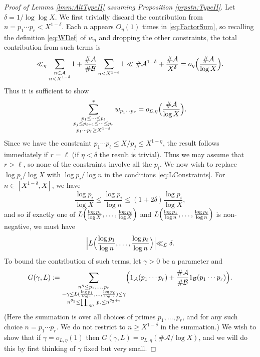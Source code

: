 \documentclass[10pt]{amsart}
\theoremstyle{plain}
\numberwithin{sblmm}{thrm}
\numberwithin{equation}{section}
\begin{document}
\begin{proof}[Proof of Lemma \ref{lmm:AltTypeII} assuming Proposition \ref{prpstn:TypeII}]
Let $\delta=1/\log\log{X}$. We first trivially discard the contribution from $n=p_1\cdots p_{r}<X^{1-\delta}$. Each $n$ appears $O_\eta(1)$ times in \eqref{eq:FactorSum}, so recalling the definition \eqref{eq:WDef} of $w_n$ and dropping the other constraints, the total contribution from such terms is
\begin{equation}
\ll_\eta \sum_{\substack{n\in \mathcal{A}\\ n<X^{1-\delta}}}1+\frac{\#\mathcal{A}}{\#\mathcal{B}}\sum_{n<X^{1-\delta}}1\ll \#\mathcal{A}^{1-\delta}+\frac{\#\mathcal{A}}{X^\delta}=o_\eta\Bigl(\frac{\#\mathcal{A}}{\log{X}}\Bigr).\label{eq:SmallTerms}
\end{equation}
Thus it is sufficient to show 
\begin{equation}
\sum_{\substack{p_1\le \dots\le p_\ell \\ p_j\le p_{\ell+1}\le \dots \le p_r\\ p_1\cdots p_r\ge X^{1-\delta}}}^* w_{p_1\cdots p_r}=o_{\mathcal{L},\eta}\Bigl(\frac{\#\mathcal{A}}{\log{X}}\Bigr).\label{eq:FactorSum2}
\end{equation}
Since we have the constraint $p_1\cdots p_\ell \le X/p_j\le X^{1-\eta}$, the result follows immediately if $r=\ell$ (if $\eta<\delta$ the result is trivial). Thus we may assume that $r>\ell$, so none of the constraints involve all the $p_i$. We now wish to replace $\log{p_i}/\log{X}$ with $\log{p_i}/\log{n}$ in the conditions \eqref{eq:LConstraints}. For $n\in[X^{1-\delta},X]$, we have
\[
\frac{\log{p_i}}{\log{X}}\le \frac{\log{p_i}}{\log{n}}\le (1+2\delta)\frac{\log{p_i}}{\log{X}},
\]
and so if exactly one of $L\Bigl(\frac{\log{p_1}}{\log{X}},\dots ,\frac{\log{p_\ell}}{\log{X}}\Bigr)$ and $L\Bigl(\frac{\log{p_1}}{\log{n}},\dots ,\frac{\log{p_\ell}}{\log{n}}\Bigr)$ is non-negative, we must have
\begin{equation}
\Bigr|L\Bigl(\frac{\log{p_1}}{\log{n}},\dots ,\frac{\log{p_\ell}}{\log{n}}\Bigr)\Bigl|\ll_\mathcal{L}\delta\label{eq:LSmall}.
\end{equation}
To bound the contribution of such terms, let $\gamma>0$ be a parameter and
\[
G(\gamma,L):=\sum_{\substack{n^{\eta}\le p_1,\dots,\,p_r \\ -\gamma\le L(\frac{\log{p_1}}{\log{n}},\dots ,\frac{\log{p_\ell}}{\log{n}})\le \gamma\\ n^{\theta_1}\le\prod_{i\in\mathcal{I}}p_i\le n^{\theta_2+\epsilon} }}\Bigl(1_{\mathcal{A}}(p_1\cdots p_r)+\frac{\#\mathcal{A}}{\#\mathcal{B}}1_{\mathcal{B}}(p_1\cdots p_r)\Bigr).
\]
(Here the summation is over all choices of primes $p_1,\dots,p_r$, and for any such choice $n=p_1\cdots p_r$. We do not restrict to $n\ge X^{1-\delta}$ in the summation.) We wish to show that if $\gamma=o_{L,\eta}(1)$ then $G(\gamma,L)=o_{L,\eta}(\#\mathcal{A}/\log{X})$, and we will do this by first thinking of $\gamma$ fixed but very small.


\end{proof}
\end{document}
